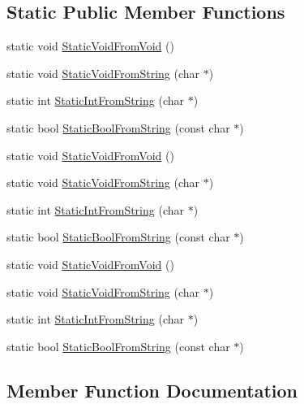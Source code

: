 \subsection*{Static Public Member Functions}
\begin{DoxyCompactItemize}
\item 
static void \mbox{\hyperlink{class_invoke_helper_ae96b5bd7c4fa328d0a87bc986f135fe8}{Static\+Void\+From\+Void}} ()
\item 
static void \mbox{\hyperlink{class_invoke_helper_a5e95ce4214e89b180da9953d94396536}{Static\+Void\+From\+String}} (char $\ast$)
\item 
static int \mbox{\hyperlink{class_invoke_helper_a5cfb11cca70ec5a9f59e8b7a4d4c2f85}{Static\+Int\+From\+String}} (char $\ast$)
\item 
static bool \mbox{\hyperlink{class_invoke_helper_aef16e38107cd8ddc0a52d7d0ab153211}{Static\+Bool\+From\+String}} (const char $\ast$)
\item 
static void \mbox{\hyperlink{class_invoke_helper_ae96b5bd7c4fa328d0a87bc986f135fe8}{Static\+Void\+From\+Void}} ()
\item 
static void \mbox{\hyperlink{class_invoke_helper_a5e95ce4214e89b180da9953d94396536}{Static\+Void\+From\+String}} (char $\ast$)
\item 
static int \mbox{\hyperlink{class_invoke_helper_a5cfb11cca70ec5a9f59e8b7a4d4c2f85}{Static\+Int\+From\+String}} (char $\ast$)
\item 
static bool \mbox{\hyperlink{class_invoke_helper_aef16e38107cd8ddc0a52d7d0ab153211}{Static\+Bool\+From\+String}} (const char $\ast$)
\item 
static void \mbox{\hyperlink{class_invoke_helper_ae96b5bd7c4fa328d0a87bc986f135fe8}{Static\+Void\+From\+Void}} ()
\item 
static void \mbox{\hyperlink{class_invoke_helper_a5e95ce4214e89b180da9953d94396536}{Static\+Void\+From\+String}} (char $\ast$)
\item 
static int \mbox{\hyperlink{class_invoke_helper_a5cfb11cca70ec5a9f59e8b7a4d4c2f85}{Static\+Int\+From\+String}} (char $\ast$)
\item 
static bool \mbox{\hyperlink{class_invoke_helper_aef16e38107cd8ddc0a52d7d0ab153211}{Static\+Bool\+From\+String}} (const char $\ast$)
\end{DoxyCompactItemize}


\subsection{Member Function Documentation}
\mbox{\label{class_invoke_helper_aef16e38107cd8ddc0a52d7d0ab153211}} 
